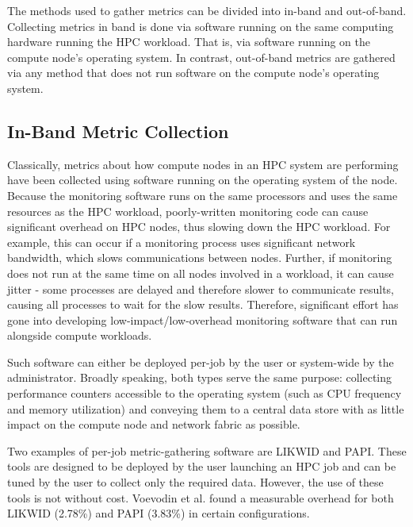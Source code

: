 \documentclass[conference]{IEEEtran}
\begin{document}
The methods used to gather metrics can be divided into in-band and out-of-band.
Collecting metrics in band is done via software running on the same computing 
hardware running the HPC workload. That is, via software running on the compute 
node's operating system. In contrast, out-of-band metrics are gathered via any 
method that does not run software on the compute node's operating system.

\subsection{In-Band Metric Collection}

Classically, metrics about how compute nodes in an HPC system are performing 
have been collected using software running on the operating system of the node. 
Because the monitoring software runs on the same processors and uses the same 
resources as the HPC workload, 
poorly-written monitoring code can cause significant overhead on HPC nodes, thus slowing 
down the HPC workload. For example,
this can occur if a monitoring process uses significant network bandwidth, 
which slows communications between nodes. Further, if monitoring does not 
run at the same time on all nodes involved in a workload, it can cause jitter - 
some processes are delayed and therefore slower to communicate results, causing 
all processes to wait for the slow results.
Therefore, significant effort has gone into developing low-impact/low-overhead
monitoring software that can run alongside compute workloads.

Such software can either be deployed per-job by the user or system-wide by the 
administrator. Broadly speaking, both types serve 
the same purpose: collecting performance counters accessible to the operating 
system (such as CPU frequency and memory utilization) and conveying them to a 
central data store with as little impact on the compute node and network fabric 
as possible.

Two examples of per-job metric-gathering software are LIKWID\cite{gruberLIKWID2024}
and PAPI\cite{mucciPAPIPortableInterface}. These tools are designed to be 
deployed by the user launching an HPC job and can be tuned by the user to 
collect only the required data. However, the use of these tools is not without 
cost.
Voevodin et al.\cite{voevodinOverheadAnalysisPerformance2022} found a measurable 
overhead for both LIKWID (2.78\%) and PAPI (3.83\%) in certain configurations.
\end{document}
